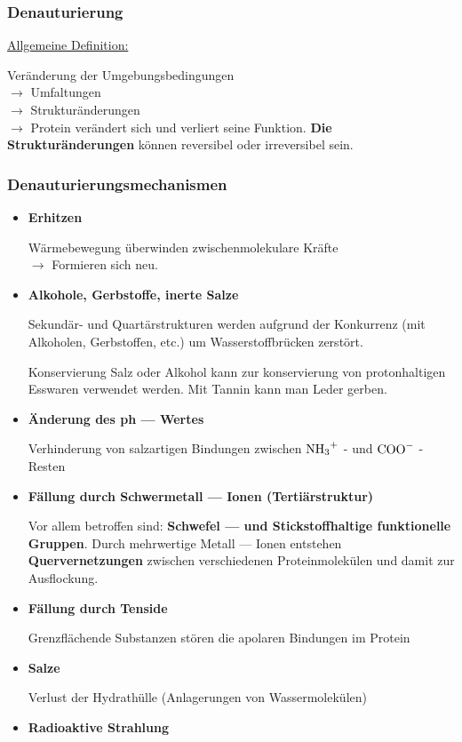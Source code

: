 \documentclass[a4paper, 12pt]{scrartcl}
\begin{document}
\subsubsection{Denauturierung}
\underline{Allgemeine Definition:}

Veränderung der Umgebungsbedingungen\\
$ \rightarrow$ Umfaltungen\\
$ \rightarrow$ Strukturänderungen\\
$ \rightarrow$ Protein verändert sich und verliert seine Funktion. \textbf{Die
    Strukturänderungen} können reversibel oder irreversibel sein.

\subsubsection{Denauturierungsmechanismen}
\begin{itemize}
    \item \textbf{Erhitzen}

        Wärmebewegung überwinden zwischenmolekulare Kräfte\\
        $ \rightarrow$ Formieren sich neu.

    \item \textbf{Alkohole, Gerbstoffe, inerte Salze}

        Sekundär- und Quartärstrukturen werden aufgrund der Konkurrenz (mit
        Alkoholen, Gerbstoffen, etc.) um Wasserstoffbrücken zerstört.
        \begin{Notiz}{Konservierung}
            Salz oder Alkohol kann zur konservierung von protonhaltigen Esswaren
            verwendet werden. Mit Tannin kann man Leder gerben.
        \end{Notiz}

    \item \textbf{Änderung des ph --- Wertes}

        Verhinderung von salzartigen Bindungen zwischen $\ce{NH3^{+}}$ - und
        $\ce{COO^{-}}$ - Resten

    \item \textbf{Fällung durch Schwermetall --- Ionen (Tertiärstruktur)}

        Vor allem betroffen sind: \textbf{Schwefel --- und Stickstoffhaltige
            funktionelle Gruppen}. Durch mehrwertige Metall --- Ionen entstehen
        \textbf{Quervernetzungen} zwischen verschiedenen Proteinmolekülen und
        damit zur Ausflockung.

    \item \textbf{Fällung durch Tenside}

        Grenzflächende Substanzen stören die apolaren Bindungen im Protein

    \item \textbf{Salze}

        Verlust der Hydrathülle (Anlagerungen von Wassermolekülen)

    \item \textbf{Radioaktive Strahlung}
\end{itemize}
\end{document}
